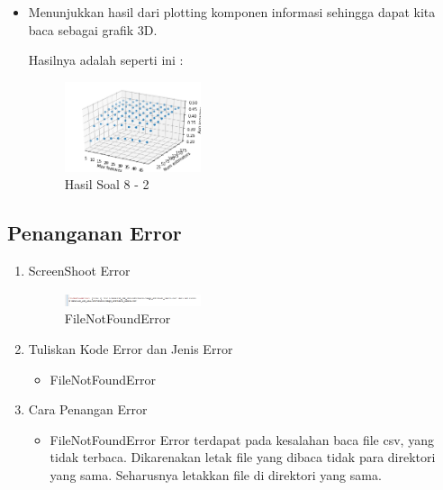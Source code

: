 \begin{enumerate}
\begin{itemize}
	\item Menunjukkan hasil dari plotting komponen informasi sehingga dapat kita baca sebagai grafik 3D.
	
	Hasilnya adalah seperti ini :

	\begin{figure}[H]
	\centering
		\includegraphics[width=4cm]{figures/1174026/3/materi/soal83.PNG}
		\caption{Hasil Soal 8 - 2}
	\end{figure}
\end{itemize}
\end{enumerate}

\subsection{Penanganan Error}
\begin{enumerate}
	\item ScreenShoot Error
	\begin{figure}[H]
		\includegraphics[width=4cm]{figures/1174026/3/error/1.PNG}
		\centering
		\caption{FileNotFoundError}
	\end{figure}
	\item Tuliskan Kode Error dan Jenis Error
	\begin{itemize}
		\item FileNotFoundError
	\end{itemize}
	\item Cara Penangan Error
	\begin{itemize}
		\item FileNotFoundError
		\hfill\break
		Error terdapat pada kesalahan baca file csv, yang tidak terbaca. Dikarenakan letak file yang dibaca tidak para direktori yang sama. Seharusnya letakkan file di direktori yang sama. 
	\end{itemize}
\end{enumerate}
